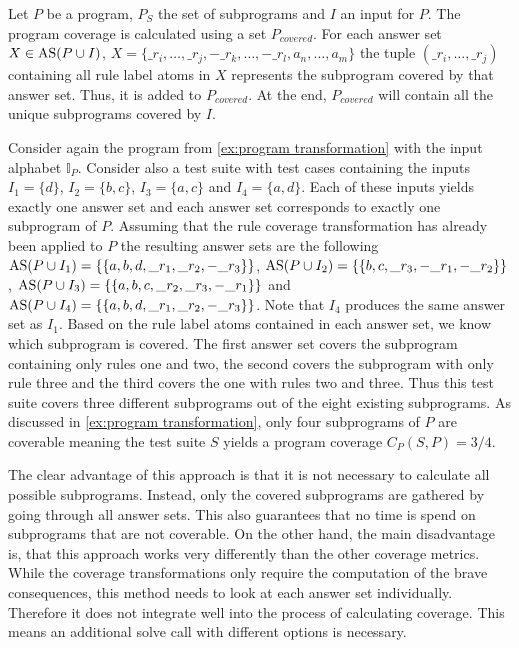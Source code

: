 \begin{definition}
\label{def:program coverage calculation}
    Let $P$ be a program, $P_S$ the set of subprograms and $I$ an input for $P$. The program coverage is calculated using a set $P_{covered}$. For each answer set \(X \in \operatorname{AS}(P \cup I)\), \(X = \{\_r_i, \ldots, \_r_j, -\_r_k, \ldots, -\_r_l, a_n, \ldots, a_m\}\) the tuple \((\_r_i, \ldots, \_r_j)\) containing all rule label atoms in $X$ represents the subprogram covered by that answer set. Thus, it is added to $P_{covered}$. At the end, $P_{covered}$ will contain all the unique subprograms covered by $I$.
\end{definition}

\begin{example}
\label{ex:program coverage calculation}
    Consider again the program from \cref{ex:program transformation} with the input alphabet $\mathbb{I}_P$. Consider also a test suite with test cases containing the inputs \(I_1 = \{d\}\), \(I_2 = \{b, c\}\), \(I_3 = \{a, c\}\) and \(I_4 = \{a, d\}\). Each of these inputs yields exactly one answer set and each answer set corresponds to exactly one subprogram of $P$. Assuming that the rule coverage transformation has already been applied to $P$ the resulting answer sets are the following \(\operatorname{AS}(P \cup I_1) = \{\{a, b, d, \_r_1, \_r_2, -\_r_3\}\}\), \(\operatorname{AS}(P \cup I_2) = \{\{b, c, \_r_3, -\_r_1, -\_r_2\}\}\), \(\operatorname{AS}(P \cup I_3) = \{\{a, b, c, \_r_2, \_r_3, -\_r_1\}\}\) and \(\operatorname{AS}(P \cup I_4) = \{\{a, b, d, \_r_1, \_r_2, -\_r_3\}\}\). Note that $I_4$ produces the same answer set as $I_1$. Based on the rule label atoms contained in each answer set, we know which subprogram is covered. The first answer set covers the subprogram containing only rules one and two, the second covers the subprogram with only rule three and the third covers the one with rules two and three. Thus this test suite covers three different subprograms out of the eight existing subprograms. As discussed in \cref{ex:program transformation}, only four subprograms of $P$ are coverable meaning the test suite $S$ yields a program coverage \(C_P(S, P) = 3 / 4\).
\end{example}

The clear advantage of this approach is that it is not necessary to calculate all possible subprograms. Instead, only the covered subprograms are gathered by going through all answer sets. This also guarantees that no time is spend on subprograms that are not coverable. On the other hand, the main disadvantage is, that this approach works very differently than the other coverage metrics. While the coverage transformations only require the computation of the brave consequences, this method needs to look at each answer set individually. Therefore it does not integrate well into the process of calculating coverage. This means an additional solve call with different options is necessary. 

